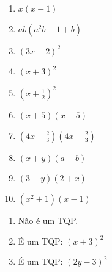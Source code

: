 \begin{description}
\begin{multicols}{2}
\begin{enumerate}[label=3.3.\alph*)]
            
            
        \end{enumerate}
    \end{multicols}
    \begin{enumerate}[label=\thesection.4.\arabic*]
        
        \ansitem{} \begin{multicols}{3}
            \begin{enumerate}[label=\alph*)]
                \item $x(x-1)$
                
                \item $ab(a^2b-1+b)$
                
                \item $(3x-2)^2$
                
                \item $(x+3)^2$
                
                \item $(x+\frac{1}{2})^2$
                
                \item $(x+5)(x-5)$
                
                \item $(4x+\frac{2}{3})(4x-\frac{2}{3})$
                
                \item $(x+y)(a+b)$
                
                \item $(3+y)(2+x)$
                
                \item $(x^2+1)(x-1)$
            \end{enumerate}
        \end{multicols}
        
        \ansitem{} \begin{multicols}{2}
            \begin{enumerate}[label=\alph*)]
                \item Não é um TQP.
                
                \item É um TQP: $(x+3)^2$
                
                \item É um TQP: $(2y-3)^2$
                

\end{enumerate}
\end{multicols}
\end{enumerate}
\end{description}
